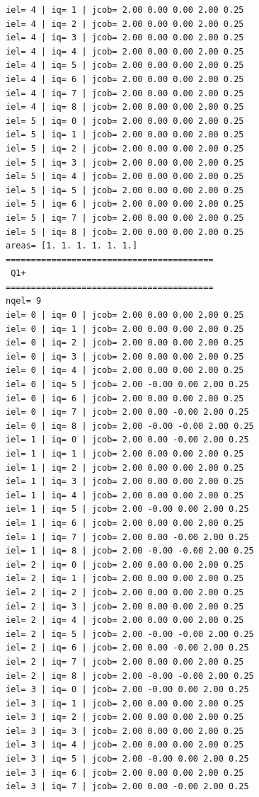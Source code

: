 \begin{tiny}
\begin{verbatim}
iel= 4 | iq= 1 | jcob= 2.00 0.00 0.00 2.00 0.25
iel= 4 | iq= 2 | jcob= 2.00 0.00 0.00 2.00 0.25
iel= 4 | iq= 3 | jcob= 2.00 0.00 0.00 2.00 0.25
iel= 4 | iq= 4 | jcob= 2.00 0.00 0.00 2.00 0.25
iel= 4 | iq= 5 | jcob= 2.00 0.00 0.00 2.00 0.25
iel= 4 | iq= 6 | jcob= 2.00 0.00 0.00 2.00 0.25
iel= 4 | iq= 7 | jcob= 2.00 0.00 0.00 2.00 0.25
iel= 4 | iq= 8 | jcob= 2.00 0.00 0.00 2.00 0.25
iel= 5 | iq= 0 | jcob= 2.00 0.00 0.00 2.00 0.25
iel= 5 | iq= 1 | jcob= 2.00 0.00 0.00 2.00 0.25
iel= 5 | iq= 2 | jcob= 2.00 0.00 0.00 2.00 0.25
iel= 5 | iq= 3 | jcob= 2.00 0.00 0.00 2.00 0.25
iel= 5 | iq= 4 | jcob= 2.00 0.00 0.00 2.00 0.25
iel= 5 | iq= 5 | jcob= 2.00 0.00 0.00 2.00 0.25
iel= 5 | iq= 6 | jcob= 2.00 0.00 0.00 2.00 0.25
iel= 5 | iq= 7 | jcob= 2.00 0.00 0.00 2.00 0.25
iel= 5 | iq= 8 | jcob= 2.00 0.00 0.00 2.00 0.25
areas= [1. 1. 1. 1. 1. 1.]
=========================================
 Q1+
=========================================
nqel= 9
iel= 0 | iq= 0 | jcob= 2.00 0.00 0.00 2.00 0.25
iel= 0 | iq= 1 | jcob= 2.00 0.00 0.00 2.00 0.25
iel= 0 | iq= 2 | jcob= 2.00 0.00 0.00 2.00 0.25
iel= 0 | iq= 3 | jcob= 2.00 0.00 0.00 2.00 0.25
iel= 0 | iq= 4 | jcob= 2.00 0.00 0.00 2.00 0.25
iel= 0 | iq= 5 | jcob= 2.00 -0.00 0.00 2.00 0.25
iel= 0 | iq= 6 | jcob= 2.00 0.00 0.00 2.00 0.25
iel= 0 | iq= 7 | jcob= 2.00 0.00 -0.00 2.00 0.25
iel= 0 | iq= 8 | jcob= 2.00 -0.00 -0.00 2.00 0.25
iel= 1 | iq= 0 | jcob= 2.00 0.00 -0.00 2.00 0.25
iel= 1 | iq= 1 | jcob= 2.00 0.00 0.00 2.00 0.25
iel= 1 | iq= 2 | jcob= 2.00 0.00 0.00 2.00 0.25
iel= 1 | iq= 3 | jcob= 2.00 0.00 0.00 2.00 0.25
iel= 1 | iq= 4 | jcob= 2.00 0.00 0.00 2.00 0.25
iel= 1 | iq= 5 | jcob= 2.00 -0.00 0.00 2.00 0.25
iel= 1 | iq= 6 | jcob= 2.00 0.00 0.00 2.00 0.25
iel= 1 | iq= 7 | jcob= 2.00 0.00 -0.00 2.00 0.25
iel= 1 | iq= 8 | jcob= 2.00 -0.00 -0.00 2.00 0.25
iel= 2 | iq= 0 | jcob= 2.00 0.00 0.00 2.00 0.25
iel= 2 | iq= 1 | jcob= 2.00 0.00 0.00 2.00 0.25
iel= 2 | iq= 2 | jcob= 2.00 0.00 0.00 2.00 0.25
iel= 2 | iq= 3 | jcob= 2.00 0.00 0.00 2.00 0.25
iel= 2 | iq= 4 | jcob= 2.00 0.00 0.00 2.00 0.25
iel= 2 | iq= 5 | jcob= 2.00 -0.00 -0.00 2.00 0.25
iel= 2 | iq= 6 | jcob= 2.00 0.00 -0.00 2.00 0.25
iel= 2 | iq= 7 | jcob= 2.00 0.00 0.00 2.00 0.25
iel= 2 | iq= 8 | jcob= 2.00 -0.00 -0.00 2.00 0.25
iel= 3 | iq= 0 | jcob= 2.00 -0.00 0.00 2.00 0.25
iel= 3 | iq= 1 | jcob= 2.00 0.00 0.00 2.00 0.25
iel= 3 | iq= 2 | jcob= 2.00 0.00 0.00 2.00 0.25
iel= 3 | iq= 3 | jcob= 2.00 0.00 0.00 2.00 0.25
iel= 3 | iq= 4 | jcob= 2.00 0.00 0.00 2.00 0.25
iel= 3 | iq= 5 | jcob= 2.00 -0.00 0.00 2.00 0.25
iel= 3 | iq= 6 | jcob= 2.00 0.00 0.00 2.00 0.25
iel= 3 | iq= 7 | jcob= 2.00 0.00 -0.00 2.00 0.25

\end{verbatim}
\end{tiny}
